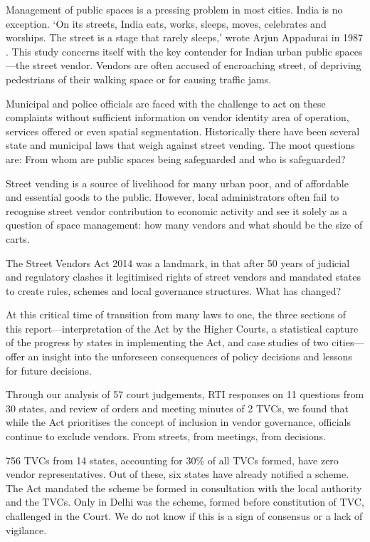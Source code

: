 \documentclass[a4paper, 12pt, twoside, table]{article}
\begin{document}
{{Management of public spaces is a pressing problem in most cities. India is no exception. `On its streets, India eats, works, sleeps, moves, celebrates and worships. The street is a stage that rarely sleeps,' wrote Arjun Appadurai in 1987 \parencite{naikpaper}. This study concerns itself with the key contender for Indian urban public spaces—the street vendor. Vendors are often accused of encroaching street, of depriving pedestrians of their walking space or for causing traffic jams. 

Municipal and police officials are faced with the challenge to act on these complaints without sufficient information on vendor identity area of operation, services offered or even spatial segmentation. Historically there have been several state and municipal laws that weigh against street vending. The moot questions are: From whom are public spaces being safeguarded and who is safeguarded? \parencite{bhowmikpaper} 

Street vending is a source of livelihood for many urban poor, and of affordable and essential goods to the public. However, local administrators often fail to recognise street vendor contribution to economic activity and see it solely as a question of space management: how many vendors and what should be the size of carts. 

The Street Vendors Act 2014 was a landmark, in that after 50 years of judicial and regulatory clashes it legitimised rights of street vendors and mandated states to create rules, schemes and local governance structures. What has changed? 

At this critical time of transition from many laws to one, the three sections of this report—interpretation of the Act by the Higher Courts, a statistical capture of the progress by states in implementing the Act, and case studies of two cities—offer an insight into the unforeseen consequences of policy decisions and lessons for future decisions. 

Through our analysis of 57 court judgements, RTI responses on 11 questions from 30 states, and review of orders and meeting minutes of 2 TVCs, we found that while the Act prioritises the concept of inclusion in vendor governance, officials continue to exclude vendors. From streets, from meetings, from decisions. 

756 TVCs from 14 states, accounting for 30\% of all TVCs formed, have zero vendor representatives. Out of these, six states have already notified a scheme. The Act mandated the scheme be formed in consultation with the local authority and the TVCs. Only in Delhi was the scheme, formed before constitution of TVC, challenged in the Court. We do not know if this is a sign of consensus or a lack of vigilance.

}}
\end{document}
